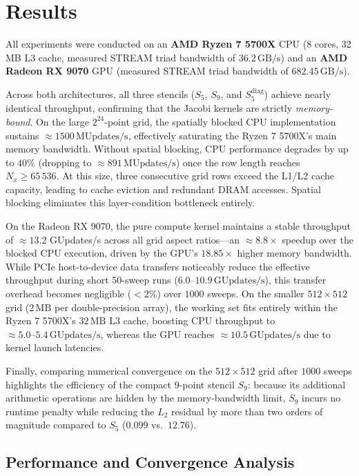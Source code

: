 \section{Results}
All experiments were conducted on an \textbf{AMD Ryzen 7 5700X} CPU (8 cores, 32\,MB L3 cache, measured STREAM triad bandwidth of $36.2\,\text{GB/s}$) and an \textbf{AMD Radeon RX 9070} GPU (measured STREAM triad bandwidth of $682.45\,\text{GB/s}$). 

Across both architectures, all three stencils ($S_5$, $S_9$, and $S_5^{\text{diag}}$) achieve nearly identical throughput, confirming that the Jacobi kernels are strictly \emph{memory-bound}. On the large $2^{24}$-point grid, the spatially blocked CPU implementation sustains $\approx 1500\,\text{MUpdates/s}$, effectively saturating the Ryzen 7 5700X's main memory bandwidth. Without spatial blocking, CPU performance degrades by up to $40\%$ (dropping to $\approx 891\,\text{MUpdates/s}$) once the row length reaches $N_x \ge 65\,536$. At this size, three consecutive grid rows exceed the L1/L2 cache capacity, leading to cache eviction and redundant DRAM accesses. Spatial blocking eliminates this layer-condition bottleneck entirely.

On the Radeon RX 9070, the pure compute kernel maintains a stable throughput of $\approx 13.2$ GUpdates/s across all grid aspect ratios---an $\approx 8.8\times$ speedup over the blocked CPU execution, driven by the GPU's $18.85\times$ higher memory bandwidth. While PCIe host-to-device data transfers noticeably reduce the effective throughput during short 50-sweep runs ($6.0\text{--}10.9\,\text{GUpdates/s}$), this transfer overhead becomes negligible ($< 2\%$) over $1000$ sweeps. On the smaller $512 \times 512$ grid ($2\,\text{MB}$ per double-precision array), the working set fits entirely within the Ryzen 7 5700X's $32\,\text{MB}$ L3 cache, boosting CPU throughput to $\approx 5.0\text{--}5.4\,\text{GUpdates/s}$, whereas the GPU reaches $\approx 10.5\,\text{GUpdates/s}$ due to kernel launch latencies.

Finally, comparing numerical convergence on the $512 \times 512$ grid after $1000$ sweeps highlights the efficiency of the compact 9-point stencil $S_9$: because its additional arithmetic operations are hidden by the memory-bandwidth limit, $S_9$ incurs no runtime penalty while reducing the $L_2$ residual by more than two orders of magnitude compared to $S_5$ ($0.099$ vs.\ $12.76$).

\subsection*{Performance and Convergence Analysis}

